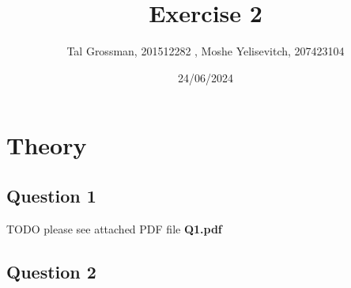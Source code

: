 \documentclass{assignmeownt}
\title{Exercise 2}
\author{Tal Grossman, 201512282 , Moshe Yelisevitch, 207423104}
\date{24/06/2024}
\begin{document}
\maketitle
\thispagestyle{firststyle}
\section{Theory}
\subsection{Question 1}
TODO
\newline
please see attached PDF file \textbf{Q1.pdf}

\subsection{Question 2}
\end{document}
